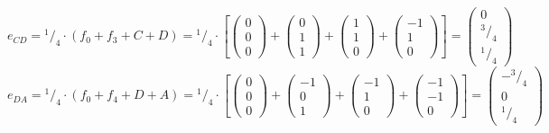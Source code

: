 \documentclass{article}
\newcommand*\rfrac[2]{{}^{#1}\!/_{#2}}%
\begin{document}
\[e_{CD}=\rfrac{1}{4}\cdot(f_0+f_3+C+D)=\rfrac{1}{4}\cdot\left[
\left({\begin{array}{c} 0 \\  0 \\ 0 \end{array}}\right)+
\left({\begin{array}{c} 0 \\ 1 \\ 1 \end{array}}\right)+
\left({\begin{array}{c} 1 \\ 1 \\ 0 \end{array}}\right)+
\left({\begin{array}{c} -1 \\  1 \\ 0 \end{array}}\right)\right]=
\left({\begin{array}{c}  0 \\ \rfrac{3}{4} \\ \rfrac{1}{4} \end{array}}\right)
\]
\[e_{DA}=\rfrac{1}{4}\cdot(f_0+f_4+D+A)=\rfrac{1}{4}\cdot\left[
\left({\begin{array}{c} 0 \\  0 \\ 0 \end{array}}\right)+
\left({\begin{array}{c} -1 \\ 0 \\ 1 \end{array}}\right)+
\left({\begin{array}{c} -1 \\ 1 \\ 0 \end{array}}\right)+
\left({\begin{array}{c} -1 \\  -1 \\ 0 \end{array}}\right)\right]=
\left({\begin{array}{c}  -\rfrac{3}{4} \\ 0 \\ \rfrac{1}{4} \end{array}}\right)
\]
\end{document}
